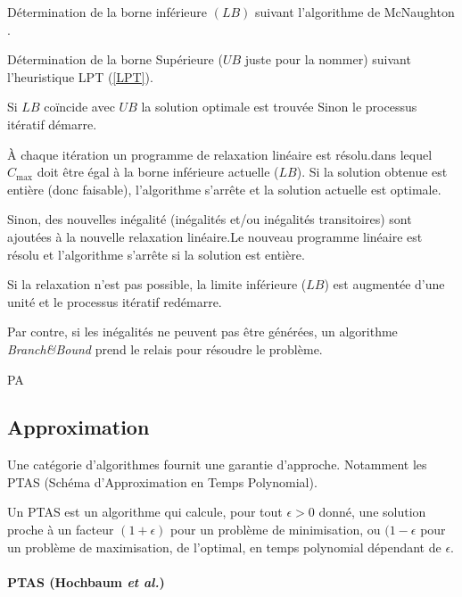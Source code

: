 \documentclass[a4paper,12pt]{report}
\theoremstyle{plain}				%
\theoremstyle{definition}				%
\begin{document}
\bigskip
\begin{algorithm}[H]
\DontPrintSemicolon

Détermination de la borne inférieure $(LB)$ suivant l'algorithme de
McNaughton \cite{mcnaughton1959scheduling}.

\BlankLine %
Détermination de la borne Supérieure ($UB$ juste pour la nommer)
suivant l'heuristique LPT (\ref{LPT}).

\BlankLine %
Si $LB$ coïncide avec $UB$ la solution optimale est trouvée Sinon le
processus itératif démarre.

\BlankLine
À chaque itération un programme de relaxation linéaire est résolu.dans
lequel $C_{\max}$ doit être égal à la borne inférieure actuelle
($LB$).
Si la solution obtenue est entière (donc faisable), l'algorithme
s'arrête et la solution actuelle est optimale.

\BlankLine
Sinon, des nouvelles inégalité (inégalités et/ou inégalités
transitoires) sont ajoutées à la nouvelle relaxation linéaire.Le
nouveau programme linéaire est résolu et l'algorithme s'arrête si la
solution est entière.

\BlankLine
Si la relaxation n'est pas possible, la limite inférieure ($LB$) est
augmentée d'une unité et le processus itératif redémarre.

\BlankLine
Par contre, si les inégalités ne peuvent pas être générées, un
algorithme \textit{Branch\&Bound} prend le relais pour résoudre le
problème.

\caption{PA\label{PA}}
\end{algorithm}


\subsection{Approximation}

Une catégorie d'algorithmes fournit une garantie d'approche.
Notamment les PTAS (Schéma d'Approximation en Temps Polynomial).

Un PTAS est un algorithme qui calcule, pour tout $\epsilon > 0$ donné,
une solution proche à un facteur $(1+\epsilon)$ pour un problème de
minimisation, ou $(1-\epsilon$ pour un problème de maximisation, de
l'optimal, en temps polynomial dépendant de $\epsilon$.


\paragraph{PTAS (Hochbaum \textit{et al.})} 
\end{document}
